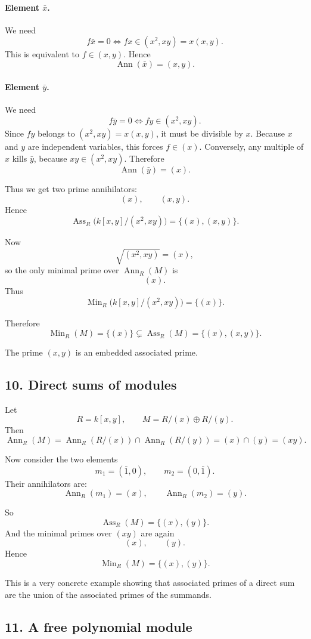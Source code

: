 \documentclass[12pt,a4paper,oneside]{report}
\DeclareMathOperator{\Ass}{Ass}
\DeclareMathOperator{\Ann}{Ann}
\DeclareMathOperator{\Min}{Min}
\theoremstyle{notespace}
\begin{document}
	\paragraph{Element \(\bar x\).}
	We need
	\[
	f\bar x=0 \iff fx\in (x^2,xy)=x(x,y).
	\]
	This is equivalent to \(f\in (x,y)\). Hence
	\[
	\Ann(\bar x)=(x,y).
	\]
	
	\paragraph{Element \(\bar y\).}
	We need
	\[
	f\bar y=0 \iff fy\in (x^2,xy).
	\]
	Since \(fy\) belongs to \((x^2,xy)=x(x,y)\), it must be divisible by \(x\). Because \(x\) and \(y\) are independent variables, this forces \(f\in (x)\). Conversely, any multiple of \(x\) kills \(\bar y\), because \(xy\in (x^2,xy)\). Therefore
	\[
	\Ann(\bar y)=(x).
	\]
	
	Thus we get two prime annihilators:
	\[
	(x),\qquad (x,y).
	\]
	Hence
	\[
	\Ass_R\bigl(k[x,y]/(x^2,xy)\bigr)=\{(x),(x,y)\}.
	\]
	
	Now
	\[
	\sqrt{(x^2,xy)}=(x),
	\]
	so the only minimal prime over \(\Ann_R(M)\) is
	\[
	(x).
	\]
	Thus
	\[
	\Min_R\bigl(k[x,y]/(x^2,xy)\bigr)=\{(x)\}.
	\]
	
	Therefore
	\[
	\Min_R(M)=\{(x)\}
	\subsetneq
	\Ass_R(M)=\{(x),(x,y)\}.
	\]
	
	The prime \((x,y)\) is an embedded associated prime.
	
	\subsection{10. Direct sums of modules}
	
	Let
	\[
	R=k[x,y],\qquad M=R/(x)\oplus R/(y).
	\]
	Then
	\[
	\Ann_R(M)=\Ann_R(R/(x))\cap \Ann_R(R/(y))=(x)\cap (y)=(xy).
	\]
	
	Now consider the two elements
	\[
	m_1=(\bar 1,0),\qquad m_2=(0,\bar 1).
	\]
	Their annihilators are:
	\[
	\Ann_R(m_1)=(x),\qquad \Ann_R(m_2)=(y).
	\]
	
	So
	\[
	\Ass_R(M)=\{(x),(y)\}.
	\]
	And the minimal primes over \((xy)\) are again
	\[
	(x),\qquad (y).
	\]
	Hence
	\[
	\Min_R(M)=\{(x),(y)\}.
	\]
	
	This is a very concrete example showing that associated primes of a direct sum are the union of the associated primes of the summands.
	
	\subsection{11. A free polynomial module}
	
\end{document}
